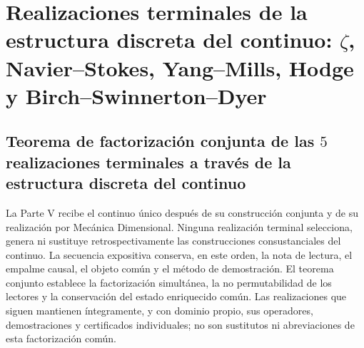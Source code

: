 \makeatletter
{}
\makeatother

\part{Realizaciones terminales de la estructura discreta del continuo: \texorpdfstring{\(\zeta\)}{zeta}, Navier--Stokes, Yang--Mills, Hodge y Birch--Swinnerton--Dyer}
\label{part:clausuras-terminales-definitiva}

\chapter{Teorema de factorización conjunta de las \(5\) realizaciones terminales a través de la estructura discreta del continuo}
\label{chap:terminal-arquitectura-natural-comun}
La Parte V recibe el continuo único después de su construcción conjunta y de
su realización por Mecánica Dimensional. Ninguna realización terminal
selecciona, genera ni sustituye retrospectivamente las construcciones
consustanciales del continuo. La secuencia expositiva conserva, en este orden,
la nota de lectura, el empalme causal, el objeto común y el método de
demostración.
El teorema conjunto establece la factorización simultánea, la no
permutabilidad de los lectores y la conservación del estado enriquecido
común. Las realizaciones que siguen mantienen íntegramente, y con dominio
propio, sus operadores, demostraciones y certificados individuales; no son
sustitutos ni abreviaciones de esta factorización común.

\begingroup
\renewcommand{\chapter}[2][]{}%

\endgroup
